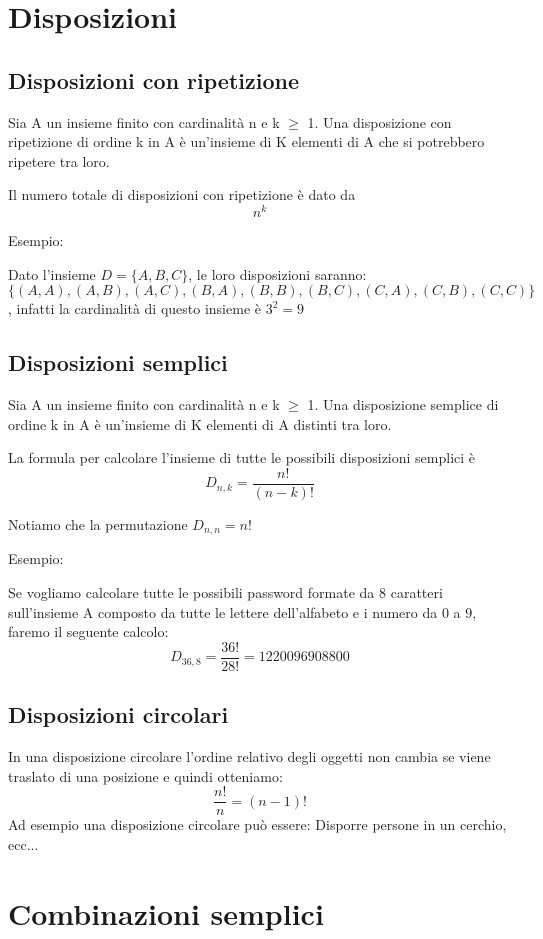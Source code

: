 \documentclass[a4paper, 10pt]{article}
\begin{document}
\section{Disposizioni}

\subsection{Disposizioni con ripetizione}
Sia A un insieme finito con cardinalità n e k $\geq$ 1. Una disposizione con ripetizione di ordine k in A è un'insieme di K elementi di A che si potrebbero ripetere tra loro.

Il numero totale di disposizioni con ripetizione è dato da $$n^k$$

Esempio:

Dato l'insieme $D=\{A,B,C\}$, le loro disposizioni saranno: $\{(A,A), (A,B), (A,C), (B,A), (B,B), (B,C), (C,A), (C,B), (C,C)\}$, infatti la cardinalità di questo insieme è $3^2=9$

\subsection{Disposizioni semplici}
Sia A un insieme finito con cardinalità n e k $\geq$ 1. Una disposizione semplice di ordine k in A è un'insieme di K elementi di A distinti tra loro.

La formula per calcolare l'insieme di tutte le possibili disposizioni semplici è 
$$D_{n,k}=\frac{n!}{(n-k)!}$$

Notiamo che la permutazione $D_{n,n}=n!$

Esempio:

Se vogliamo calcolare tutte le possibili password formate da 8 caratteri sull'insieme A composto da tutte le lettere dell'alfabeto e i numero da 0 a 9, faremo il seguente calcolo:
$$D_{36,8}=\frac{36!}{28!} = 1220096908800$$

\subsection{Disposizioni circolari}

In una disposizione circolare l'ordine relativo degli oggetti non cambia se viene traslato di una posizione e quindi otteniamo:
$$\frac{n!}{n}=(n-1)!$$
Ad esempio una disposizione circolare può essere: Disporre persone in un cerchio, ecc...

\section{Combinazioni semplici}
\end{document}
